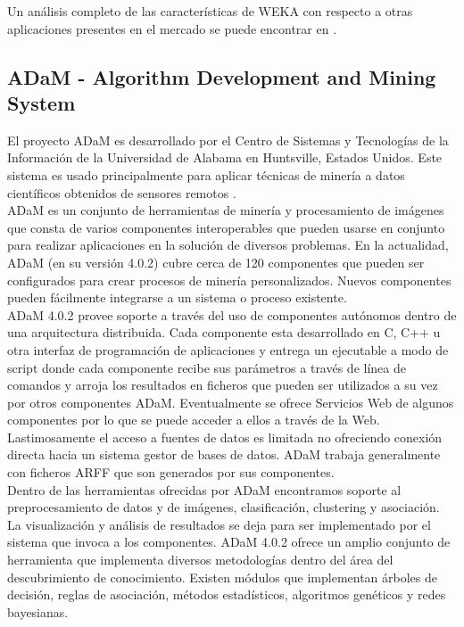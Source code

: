 Un an\'alisis completo de las caracter\'isticas de WEKA con respecto a otras aplicaciones presentes en el mercado
se puede encontrar en \cite{10}.

\subsection{ADaM - Algorithm Development and Mining System}
El proyecto ADaM es desarrollado por el Centro de Sistemas y Tecnolog\'ias de la Informaci\'on de la Universidad
de Alabama en Huntsville, Estados Unidos.  Este sistema es usado principalmente para aplicar t\'ecnicas de
miner\'ia a datos cient\'ificos obtenidos de sensores remotos \cite{adam}.\\

ADaM es un conjunto de herramientas de miner\'ia y procesamiento de im\'agenes que consta de varios componentes
interoperables que pueden u\-sarse en conjunto para realizar aplicaciones en la soluci\'on de diversos
pro\-blemas. En la actualidad, ADaM (en su versi\'on 4.0.2) cubre cerca de 120 componentes \cite{adamComp} que
pueden ser configurados para crear procesos de mine\-r\'ia personalizados.  Nuevos componentes pueden f\'acilmente
integrarse a un sistema o proceso existente.\\

ADaM 4.0.2 provee soporte a trav\'es del uso de componentes aut\'onomos dentro de una arquitectura distribuida. 
Cada componente esta desarrollado en C, C++ u otra interfaz de programaci\'on de aplicaciones y entrega un
ejecutable a modo de script donde cada componente recibe sus par\'ametros a trav\'es de l\'inea de comandos y
arroja los resultados en ficheros que pueden ser utilizados a su vez por otros componentes ADaM.  Eventualmente
se ofrece Servicios Web de algunos componentes por lo que se puede acceder a ellos a trav\'es de la Web.\\

Lastimosamente el acceso a fuentes de datos es limitada no ofreciendo conexi\'on directa hacia un sistema gestor
de bases de datos. ADaM trabaja generalmente con ficheros ARFF \cite{arff} que son generados por sus
componentes.\\

Dentro de las herramientas ofrecidas por ADaM encontramos soporte al preprocesamiento de datos y de im\'agenes,
clasificaci\'on, clustering y asociaci\'on.  La visualizaci\'on y an\'alisis de resultados se deja para ser 
implementado por el sistema que invoca a los componentes. ADaM 4.0.2 ofrece un amplio conjunto de herramienta que
implementa diversos metodolog\'ias dentro del \'area del descubrimiento de conocimiento.  Existen m\'odulos que
implementan \'arboles de decisi\'on, reglas de asociaci\'on, m\'etodos estad\'isticos, algoritmos gen\'eticos y
redes bayesianas.\\

